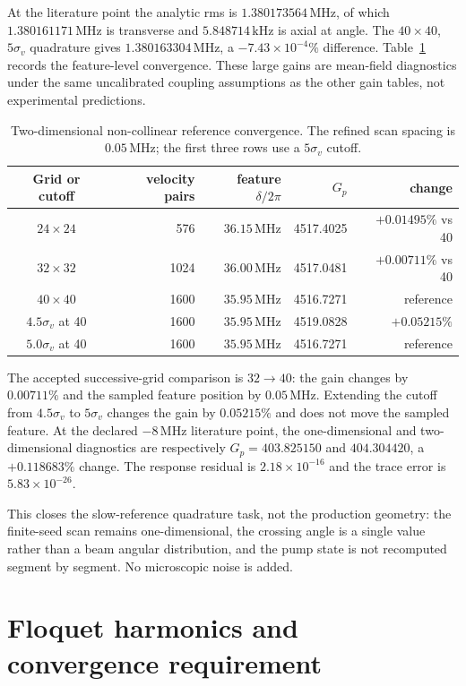 \documentclass[11pt,a4paper]{article}
\newcommand{\MHz}{\,\mathrm{MHz}}
\newcommand{\kHz}{\,\mathrm{kHz}}
\begin{document}
At the literature point the analytic rms is $1.380173564\MHz$, of which
$1.380161171\MHz$ is transverse and $5.848714\kHz$ is axial at angle. The
$40\times40$, $5\sigma_v$ quadrature gives $1.380163304\MHz$, a
$-7.43\times10^{-4}\%$ difference. Table~\ref{tab:angular-doppler-convergence}
records the feature-level convergence. These large gains are mean-field
diagnostics under the same uncalibrated coupling assumptions as the other gain
tables, not experimental predictions.

\begin{table}[ht]
\centering
\caption{Two-dimensional non-collinear reference convergence. The refined
scan spacing is $0.05\MHz$; the first three rows use a $5\sigma_v$ cutoff.}
\label{tab:angular-doppler-convergence}
\small
\begin{tabular}{c r r r r}
\toprule
Grid or cutoff & velocity pairs & feature $\delta/2\pi$ & $G_p$ & change\\
\midrule
$24\times24$ & 576 & $36.15\MHz$ & 4517.4025 & $+0.01495\%$ vs 40\\
$32\times32$ & 1024 & $36.00\MHz$ & 4517.0481 & $+0.00711\%$ vs 40\\
$40\times40$ & 1600 & $35.95\MHz$ & 4516.7271 & reference\\
$4.5\sigma_v$ at 40 & 1600 & $35.95\MHz$ & 4519.0828 & $+0.05215\%$\\
$5.0\sigma_v$ at 40 & 1600 & $35.95\MHz$ & 4516.7271 & reference\\
\bottomrule
\end{tabular}
\end{table}

The accepted successive-grid comparison is $32\to40$: the gain changes by
$0.00711\%$ and the sampled feature position by $0.05\MHz$. Extending the
cutoff from $4.5\sigma_v$ to $5\sigma_v$ changes the gain by $0.05215\%$ and
does not move the sampled feature. At the declared $-8\MHz$ literature point,
the one-dimensional and two-dimensional diagnostics are respectively
$G_p=403.825150$ and $404.304420$, a $+0.118683\%$ change. The response residual
is $2.18\times10^{-16}$ and the trace error is $5.83\times10^{-26}$.

This closes the slow-reference quadrature task, not the production geometry:
the finite-seed scan remains one-dimensional, the crossing angle is a single
value rather than a beam angular distribution, and the pump state is not
recomputed segment by segment. No microscopic noise is added.

\section{Floquet harmonics and convergence requirement}
\end{document}
